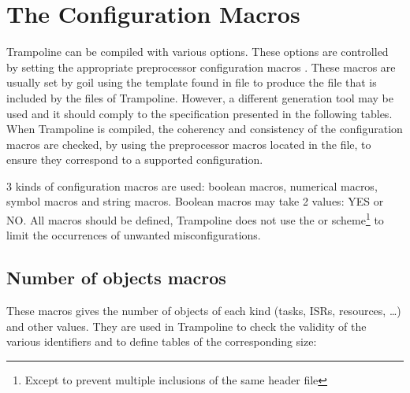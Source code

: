 \documentclass[11pt]{manual}
\begin{document}
\section{The Configuration Macros}
\label{sec:configmacros}

Trampoline can be compiled with various options. These options are controlled by setting the appropriate preprocessor configuration macros%
.
These macros are usually set by goil%
using the template found in  file to produce the  file that is included by the files of Trampoline. However, a different generation tool may be used and it should comply to the specification presented in the following tables. When Trampoline is compiled, the coherency and consistency of the configuration macros are checked, by using the preprocessor macros located in the  file, to ensure they correspond to a supported configuration.

3 kinds of configuration macros are used: boolean macros, numerical macros, symbol macros and string macros. Boolean macros may take 2 values: YES or NO. All macros should be defined, Trampoline does not use the  or  scheme\footnote{Except to prevent multiple inclusions of the same header file} to limit the occurrences of unwanted misconfigurations.

\subsection{Number of objects macros}

These macros gives the number of objects of each kind (tasks, ISRs, resources, \ldots) and other values. They are used in Trampoline to check the validity of the various identifiers and to define tables of the corresponding size:
 
\end{document}
